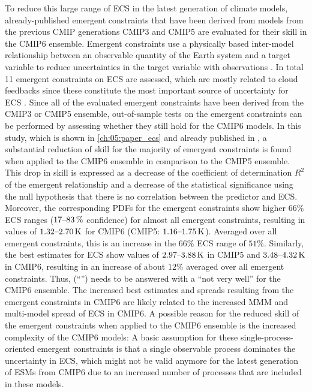 To reduce this large range of \ac{ECS} in the latest generation of climate
models, already-published emergent constraints that have been derived from
models from the previous \ac{CMIP} generations \acs{CMIP}3 and \acs{CMIP}5 are
evaluated for their skill in the \acs{CMIP}6 ensemble. Emergent constraints use
a physically based inter-model relationship between an observable quantity of
the Earth system and a target variable to reduce uncertainties in the target
variable with observations \autocite{Allen2002}. In total 11 emergent
constraints on \ac{ECS} are assessed, which are mostly related to cloud
feedbacks since these constitute the most important source of uncertainty for
\ac{ECS} \autocite{Boucher2013, Flato2013}. Since all of the evaluated emergent
constraints have been derived from the \acs{CMIP}3 or \acs{CMIP}5 ensemble,
out-of-sample tests on the emergent constraints can be performed by assessing
whether they still hold for the \acs{CMIP}6 models. In this study, which is
shown in \cref{ch:05:paper_ecs} and already published in
\textcite{Schlund2020a}, a substantial reduction of skill for the majority of
emergent constraints is found when applied to the \acs{CMIP}6 ensemble in
comparison to the \acs{CMIP}5 ensemble. This drop in skill is expressed as a
decrease of the coefficient of determination $R^2$ of the emergent relationship
and a decrease of the statistical significance using the null hypothesis that
there is no correlation between the predictor and \ac{ECS}. Moreover, the
corresponding \acp{PDF} for the emergent constraints show higher $66 \unit{\%}$
\ac{ECS} ranges ($\rangeunit{17}{83}{\%}$ confidence) for almost all emergent
constraints, resulting in values of $\rangeunit{1.32}{2.70}{K}$ for \acs{CMIP}6
(\acs{CMIP}5: $\rangeunit{1.16}{1.75}{K}$). Averaged over all emergent
constraints, this is an increase in the $66 \unit{\%}$ \ac{ECS} range of $51
\unit{\%}$. Similarly, the best estimates for \ac{ECS} show values of
$\rangeunit{2.97}{3.88}{K}$ in \acs{CMIP}5 and $\rangeunit{3.48}{4.32}{K}$ in
\acs{CMIP}6, resulting in an increase of about $12 \unit{\%}$ averaged over all
emergent constraints. Thus, 
(\enquote{\KeyScienceQuestionTwo{}}) needs to be answered with a \enquote{not
  very well} for the \acs{CMIP}6 ensemble. The increased best estimates and
spreads resulting from the emergent constraints in \acs{CMIP}6 are likely
related to the increased \ac{MMM} and multi-model spread of \ac{ECS} in
\acs{CMIP}6. A possible reason for the reduced skill of the emergent
constraints when applied to the \acs{CMIP}6 ensemble is the increased
complexity of the \acs{CMIP}6 models: A basic assumption for these
single-process-oriented emergent constraints is that a single observable
process dominates the uncertainty in \ac{ECS}, which might not be valid anymore
for the latest generation of \acp{ESM} from \acs{CMIP}6 due to an increased
number of processes that are included in these models.

